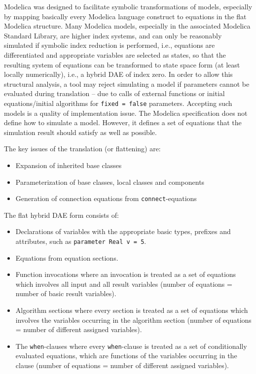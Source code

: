 Modelica was designed to facilitate symbolic transformations of models, especially by mapping basically every Modelica language construct to equations in the flat Modelica structure.
Many Modelica models, especially in the associated Modelica Standard Library, are higher index systems, and can only be reasonably simulated if symbolic index reduction is performed, i.e., equations are differentiated and appropriate variables are selected as states, so that the resulting system of equations can be transformed to state space form (at least locally numerically), i.e., a hybrid DAE of index zero.
In order to allow this structural analysis, a tool may reject simulating a model if parameters cannot be evaluated during translation -- due to calls of external functions or initial equations/initial algorithms for \lstinline!fixed = false! parameters.
Accepting such models is a quality of implementation issue.
The Modelica specification does not define how to simulate a model.
However, it defines a set of equations that the simulation result should satisfy as well as possible.

The key issues of the translation (or flattening) are:
\begin{itemize}
\item
  Expansion of inherited base classes
\item
  Parameterization of base classes, local classes and components
\item
  Generation of connection equations from \lstinline!connect!-equations
\end{itemize}

The flat hybrid DAE form consists of:
\begin{itemize}
\item
  Declarations of variables with the appropriate basic types, prefixes and attributes, such as \lstinline!parameter Real v = 5!.
\item
  Equations from equation sections.
\item
  Function invocations where an invocation is treated as a set of equations which involves all input and all result variables (number of equations = number of basic result variables).
\item
  Algorithm sections where every section is treated as a set of equations which involves the variables occurring in the algorithm section (number of equations = number of different assigned variables).
\item
  The \lstinline!when!-clauses where every \lstinline!when!-clause is treated as a set of conditionally evaluated equations, which are functions of the variables occurring in the clause (number of equations = number of different assigned variables).
\end{itemize}

